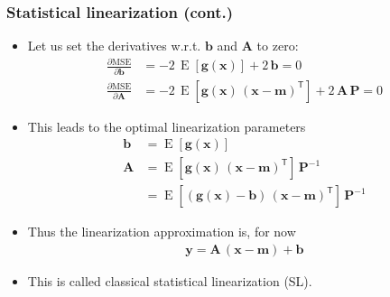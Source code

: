 \documentclass[first=dgreen,second=purple,presentation]{elecslides}
\newcommand{\mbf}[1]{\mathbf{#1}}
\newcommand{\T}[0]{\mathsf{T}}
\DeclareMathOperator{\E}{E}
\newcommand{\vb}{\mbf{b}}
\newcommand{\vg}{\mbf{g}}
\newcommand{\vm}{\mbf{m}}
\newcommand{\vx}{\mbf{x}}
\newcommand{\vy}{\mbf{y}}
\newcommand{\MA}{\mbf{A}}
\newcommand{\MP}{\mbf{P}}
\begin{document}
\begin{frame}
 \frametitle{Statistical linearization (cont.)}

\begin{itemize}[<+->]
\item Let us \alert{set the derivatives} w.r.t. $\vb$ and $\MA$ to \alert{zero}:
%
\begin{equation}
\begin{split}
  \frac{\partial \mathrm{MSE}}{\partial \vb} &= - 2 \, \E\left[ \vg(\vx) \right] + 2 \, \vb = 0 \\
  \frac{\partial \mathrm{MSE}}{\partial \MA} &= -2 \, \E\left[ \vg(\vx) \, (\vx - \vm)^\T \right] + 2 \, \MA \, \MP = 0
\end{split}
\nonumber
\end{equation}
%
\item This leads to the \alert{optimal linearization parameters}
%
\begin{equation}
\begin{split}
  \vb &= \E\left[ \vg(\vx) \right] \\
  \MA &= \E\left[ \vg(\vx) \, (\vx - \vm)^\T \right] \, \MP^{-1} \\
  &= \E\left[ (\vg(\vx) - \vb) \, (\vx - \vm)^\T \right] \, \MP^{-1}
\end{split}
\nonumber
\end{equation}

\item Thus the \alert{linearization approximation} is, for now
%
\begin{equation}
\begin{split}
  \vy = \MA \, (\vx - \vm) + \vb
\end{split}
\nonumber
\end{equation}

\item This is called classical \alert{statistical linearization (SL)}.
\end{itemize}
\end{frame}
\end{document}
